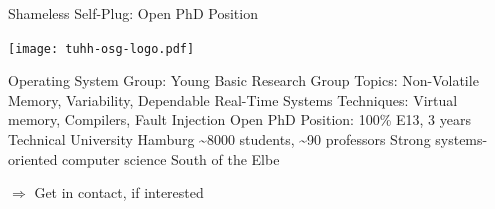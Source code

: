 \RequirePackage{luatex85}\documentclass[beamer,xcolor={table,rgb,dvipsnames}]{beamer}
\begin{document}
\begin{frame}{Shameless Self-Plug: Open PhD Position}
  \begin{center}
    \texttt{[image: tuhh-osg-logo.pdf]}
  \end{center}
  \bi
  \ii Operating System Group: Young Basic Research Group {
    \bi
    \ii Topics: Non-Volatile Memory, Variability, Dependable Real-Time Systems
    \ii Techniques: Virtual memory, Compilers, Fault Injection
    \ii Open PhD Position: 100\% E13, 3 years
    \ei
  }
  \ii Technical University Hamburg {
    \bi
    \ii \textasciitilde 8000 students,  \textasciitilde 90 professors
    \ii Strong systems-oriented computer science
    \ii South of the Elbe
    \ei
  }
  \ei

  \Large\color{srared}$\Rightarrow$ Get in contact, if interested
  
\end{frame}






\nocite{rommel:19:eurosys,rommel:20:osdi,rothberg:16:fas-dspl,rommel:19:plos}
\InsertBibliography
\end{document}
